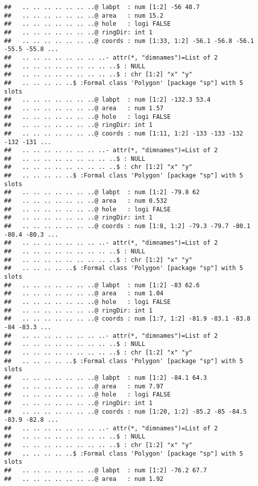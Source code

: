 \documentclass[]{article}
\begin{document}
\begin{verbatim}
##   .. .. .. .. .. .. ..@ labpt  : num [1:2] -56 48.7
##   .. .. .. .. .. .. ..@ area   : num 15.2
##   .. .. .. .. .. .. ..@ hole   : logi FALSE
##   .. .. .. .. .. .. ..@ ringDir: int 1
##   .. .. .. .. .. .. ..@ coords : num [1:33, 1:2] -56.1 -56.8 -56.1 -55.5 -55.8 ...
##   .. .. .. .. .. .. .. ..- attr(*, "dimnames")=List of 2
##   .. .. .. .. .. .. .. .. ..$ : NULL
##   .. .. .. .. .. .. .. .. ..$ : chr [1:2] "x" "y"
##   .. .. .. .. ..$ :Formal class 'Polygon' [package "sp"] with 5 slots
##   .. .. .. .. .. .. ..@ labpt  : num [1:2] -132.3 53.4
##   .. .. .. .. .. .. ..@ area   : num 1.57
##   .. .. .. .. .. .. ..@ hole   : logi FALSE
##   .. .. .. .. .. .. ..@ ringDir: int 1
##   .. .. .. .. .. .. ..@ coords : num [1:11, 1:2] -133 -133 -132 -132 -131 ...
##   .. .. .. .. .. .. .. ..- attr(*, "dimnames")=List of 2
##   .. .. .. .. .. .. .. .. ..$ : NULL
##   .. .. .. .. .. .. .. .. ..$ : chr [1:2] "x" "y"
##   .. .. .. .. ..$ :Formal class 'Polygon' [package "sp"] with 5 slots
##   .. .. .. .. .. .. ..@ labpt  : num [1:2] -79.8 62
##   .. .. .. .. .. .. ..@ area   : num 0.532
##   .. .. .. .. .. .. ..@ hole   : logi FALSE
##   .. .. .. .. .. .. ..@ ringDir: int 1
##   .. .. .. .. .. .. ..@ coords : num [1:8, 1:2] -79.3 -79.7 -80.1 -80.4 -80.3 ...
##   .. .. .. .. .. .. .. ..- attr(*, "dimnames")=List of 2
##   .. .. .. .. .. .. .. .. ..$ : NULL
##   .. .. .. .. .. .. .. .. ..$ : chr [1:2] "x" "y"
##   .. .. .. .. ..$ :Formal class 'Polygon' [package "sp"] with 5 slots
##   .. .. .. .. .. .. ..@ labpt  : num [1:2] -83 62.6
##   .. .. .. .. .. .. ..@ area   : num 1.04
##   .. .. .. .. .. .. ..@ hole   : logi FALSE
##   .. .. .. .. .. .. ..@ ringDir: int 1
##   .. .. .. .. .. .. ..@ coords : num [1:7, 1:2] -81.9 -83.1 -83.8 -84 -83.3 ...
##   .. .. .. .. .. .. .. ..- attr(*, "dimnames")=List of 2
##   .. .. .. .. .. .. .. .. ..$ : NULL
##   .. .. .. .. .. .. .. .. ..$ : chr [1:2] "x" "y"
##   .. .. .. .. ..$ :Formal class 'Polygon' [package "sp"] with 5 slots
##   .. .. .. .. .. .. ..@ labpt  : num [1:2] -84.1 64.3
##   .. .. .. .. .. .. ..@ area   : num 7.97
##   .. .. .. .. .. .. ..@ hole   : logi FALSE
##   .. .. .. .. .. .. ..@ ringDir: int 1
##   .. .. .. .. .. .. ..@ coords : num [1:20, 1:2] -85.2 -85 -84.5 -83.9 -82.8 ...
##   .. .. .. .. .. .. .. ..- attr(*, "dimnames")=List of 2
##   .. .. .. .. .. .. .. .. ..$ : NULL
##   .. .. .. .. .. .. .. .. ..$ : chr [1:2] "x" "y"
##   .. .. .. .. ..$ :Formal class 'Polygon' [package "sp"] with 5 slots
##   .. .. .. .. .. .. ..@ labpt  : num [1:2] -76.2 67.7
##   .. .. .. .. .. .. ..@ area   : num 1.92

\end{verbatim}
\end{document}
